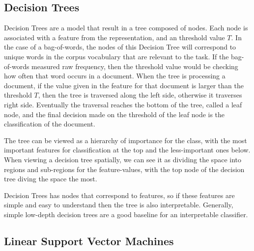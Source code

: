 



\subsection{Decision Trees}\label{bg:trees}

Decision Trees are a model that result in a tree composed of nodes. Each node is associated with a feature from the representation, and  an  threshold value $T$. In the case of a bag-of-words, the nodes of this Decision Tree will correspond to unique words in the corpus vocabulary that are relevant to the task. If the bag-of-words measured raw frequency, then the threshold value would be checking how often that word occurs in  a document.  When the tree is processing a document, if the value given in the feature for that document is larger than the threshold $T$, then the tree is traversed along the left side, otherwise it traverses right side. Eventually the traversal reaches the bottom of the tree, called a leaf node, and the final  decision made on the threshold of the leaf node is the classification of the document. 

The tree can be viewed as a hierarchy of importance for the class, with the most important features for classification at the top and the less-important ones below. When viewing a decision tree spatially, we can see it as dividing the space into regions and sub-regions for the feature-values, with the top node of the decision tree diving the space the most.

Decision Trees has nodes that correspond to features, so if these features are simple and easy to understand then the tree is also interpretable. Generally, simple low-depth decision trees are a good baseline for an interpretable classifier. 




\subsection{Linear Support Vector Machines}\label{bg:svm}

